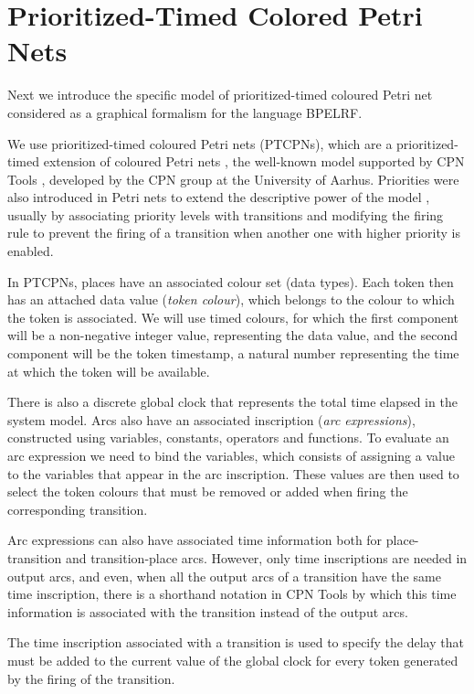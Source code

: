 \section{Prioritized-Timed Colored Petri Nets}\label{petrinet}

Next we introduce the specific model of prioritized-timed
coloured Petri net considered as a graphical formalism for the language BPELRF. 
 

We use prioritized-timed coloured Petri nets (PTCPNs), 
which are
a prioritized-timed extension of coloured Petri nets \cite{Jensen97},
the well-known model supported by CPN Tools \cite{CPNTools},
developed by the CPN group at the University of Aarhus.
Priorities were also introduced in Petri nets to extend the descriptive 
power of the model \cite{Bau96,BestK92,Pet81}, usually by
associating priority levels with transitions and modifying the firing
rule to prevent the firing of a transition when another one with
higher priority is enabled.

In PTCPNs, places have an associated colour set (data types). 
Each token then  has  an attached data value
({\em token colour}),
which belongs to the colour to which the token is
associated. We will use timed colours, for which the first component
will be a non-negative integer value, representing the data value,
and the second component will be the token timestamp,
a natural number representing the time at which the 
token will be available.

There is also a discrete global clock that represents
the total time elapsed in the system model. Arcs also have 
an associated inscription ({\em arc expressions}),
constructed using variables, constants, operators
and functions. 
To evaluate an arc expression we need to
bind the variables, which consists of assigning
a value to the variables that appear in the
arc inscription. These values are then used to
select the token colours that must be removed or added when
firing the corresponding transition.

Arc expressions can also have associated time information
both for place-transition and transition-place arcs.
However, only time inscriptions are needed
in output arcs, and even, when all the output arcs
of a transition have the same time inscription,
there is a shorthand notation in CPN Tools
by which this time information is associated with
the transition instead of the output arcs.

The time inscription associated with a transition 
is used to specify the delay that must be added to the
current value of the global clock for
every token generated by the firing of the transition.

